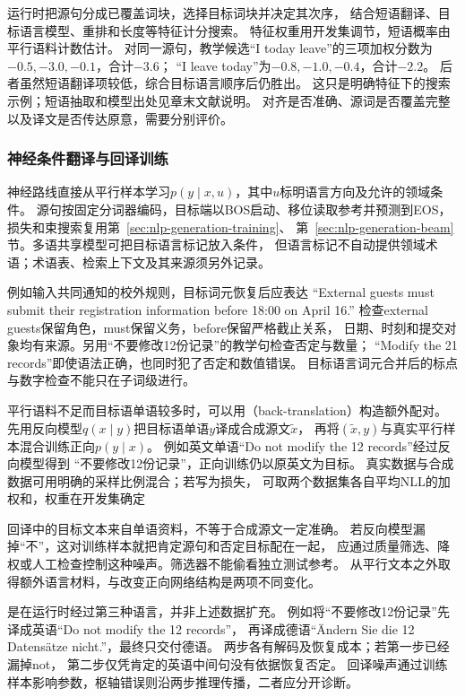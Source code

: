 运行时把源句分成已覆盖词块，选择目标词块并决定其次序，
结合短语翻译、目标语言模型、重排和长度等特征计分搜索。
特征权重用开发集调节，短语概率由平行语料计数估计。
对同一源句，教学候选“I today leave”的三项加权分数为
$-0.5,-3.0,-0.1$，合计$-3.6$；
“I leave today”为$-0.8,-1.0,-0.4$，合计$-2.2$。
后者虽然短语翻译项较低，综合目标语言顺序后仍胜出。
这只是明确特征下的搜索示例；短语抽取和模型出处见章末文献说明。
对齐是否准确、源词是否覆盖完整以及译文是否传达原意，需要分别评价。

\subsubsection{神经条件翻译与回译训练}
\label{sec:nlp-generation-neural-translation}

神经路线直接从平行样本学习$p(y\mid x,u)$，其中$u$标明语言方向及允许的领域条件。
源句按固定分词器编码，目标端以BOS启动、移位读取参考并预测到EOS，
损失和束搜索复用第~\ref{sec:nlp-generation-training}、
第~\ref{sec:nlp-generation-beam}节。多语共享模型可把目标语言标记放入条件，
但语言标记不自动提供领域术语；术语表、检索上下文及其来源须另外记录。

例如输入共同通知的校外规则，目标词元恢复后应表达
“External guests must submit their registration information before 18:00 on April 16.”
检查external guests保留角色，must保留义务，before保留严格截止关系，
日期、时刻和提交对象均有来源。另用“不要修改12份记录”的教学句检查否定与数量；
“Modify the 21 records”即使语法正确，也同时犯了否定和数值错误。
目标语言词元合并后的标点与数字检查不能只在子词级进行。

平行语料不足而目标语单语较多时，可以用（back-translation）构造额外配对。
先用反向模型$q(x\mid y)$把目标语单语$y$译成合成源文$\widetilde{x}$，
再将$(\widetilde{x},y)$与真实平行样本混合训练正向$p(y\mid x)$。
例如英文单语“Do not modify the 12 records”经过反向模型得到
“不要修改12份记录”，正向训练仍以原英文为目标。
真实数据与合成数据可用明确的采样比例混合；若写为损失，
可取两个数据集各自平均NLL的加权和，权重在开发集确定

回译中的目标文本来自单语资料，不等于合成源文一定准确。
若反向模型漏掉“不”，这对训练样本就把肯定源句和否定目标配在一起，
应通过质量筛选、降权或人工检查控制这种噪声。筛选器不能偷看独立测试参考。
从平行文本之外取得额外语言材料，与改变正向网络结构是两项不同变化。

是在运行时经过第三种语言，并非上述数据扩充。
例如将“不要修改12份记录”先译成英语“Do not modify the 12 records”，
再译成德语“Ändern Sie die 12 Datensätze nicht.”，最终只交付德语。
两步各有解码及恢复成本；若第一步已经漏掉not，
第二步仅凭肯定的英语中间句没有依据恢复否定。
回译噪声通过训练样本影响参数，枢轴错误则沿两步推理传播，二者应分开诊断。

